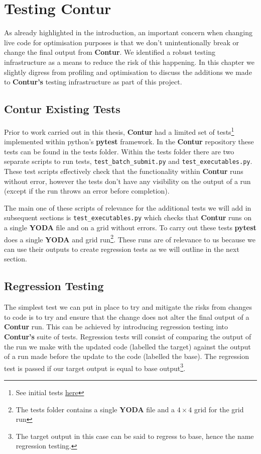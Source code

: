\chapter{Testing Contur}
\label{chapterlabel4}
As already highlighted in the introduction, an important concern when changing live code for optimisation purposes is that we don't unintentionally break or change the final output from \textbf{Contur}.  We identified a robust testing infrastructure as a means to reduce the risk of this happening. In this chapter we slightly digress from profiling and optimisation to discuss the additions we made to \textbf{Contur's} testing infrastructure as part of this project.

\section{Contur Existing Tests}
Prior to work carried out in this thesis, \textbf{Contur} had a limited set of tests\footnote{See initial tests \href{https://gitlab.com/hepcedar/contur/-/tree/49a67e039cf93c88b39dade3dfb7c5f03e780fb2/tests}{here}} implemented within python's \textbf{pytest} framework\cite{pytest}. In the \textbf{Contur} repository these tests can be found in the tests folder. Within the tests folder there are two separate scripts to run tests, \texttt{test\_batch\_submit.py} and \texttt{test\_executables.py}. These test scripts effectively check that the functionality within \textbf{Contur} runs without error, however the tests don't have any visibility on the output of a run (except if the run throws an error before completion).

The main one of these scripts of relevance for the additional tests we will add in subsequent sections is \texttt{test\_executables.py} which checks that \textbf{Contur} runs on a single \textbf{YODA} file and on a grid without errors. To carry out these tests \textbf{pytest} does a single \textbf{YODA} and grid run\footnote{The tests folder contains a single \textbf{YODA} file and a $4 \times 4$ grid for the grid run}. These runs are of relevance to us because we can use their outputs to create regression tests as we will outline in the next section.

\section{Regression Testing}
The simplest test we can put in place to try and mitigate the risks from changes to code is to try and ensure that the change does not alter the final output of a \textbf{Contur} run. This can be achieved by introducing regression testing into \textbf{Contur's} suite of tests. Regression tests will consist of comparing the output of the run we make with the updated code (labelled the target) against the output of a run made before the update to the code (labelled the base). The regression test is passed if our target output is equal to base output\footnote{The target output in this case can be said to regress to base, hence the name regression testing.}. 

